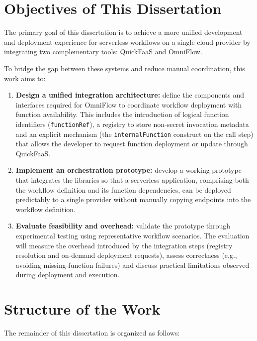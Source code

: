 \section{Objectives of This Dissertation}
\label{sec:int_objectives}

The primary goal of this dissertation is to achieve a more unified development and deployment experience for serverless workflows on a single cloud provider by integrating two complementary tools: QuickFaaS and OmniFlow.

To bridge the gap between these systems and reduce manual coordination, this work aims to:

\begin{enumerate}
	\item \textbf{Design a unified integration architecture:} define the components and interfaces required for OmniFlow to coordinate workflow deployment with function availability. This includes the introduction of logical function identifiers (\texttt{functionRef}), a registry to store non-secret invocation metadata and an explicit mechanism (the \texttt{internalFunction} construct on the call step) that allows the developer to request function deployment or update through QuickFaaS.

	\item \textbf{Implement an orchestration prototype:} develop a working prototype that integrates the libraries so that a serverless application, comprising both the workflow definition and its function dependencies, can be deployed predictably to a single provider without manually copying endpoints into the workflow definition.

	\item \textbf{Evaluate feasibility and overhead:} validate the prototype through experimental testing using representative workflow scenarios. The evaluation will measure the overhead introduced by the integration steps (registry resolution and on-demand deployment requests), assess correctness (e.g., avoiding missing-function failures) and discuss practical limitations observed during deployment and execution.
\end{enumerate}


\section{Structure of the Work}
\label{sec:int_structure}

The remainder of this dissertation is organized as follows:

